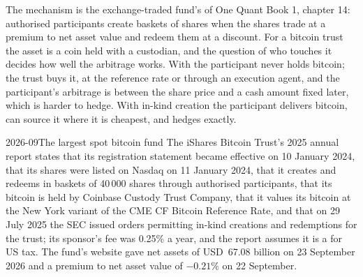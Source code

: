 The mechanism is the exchange-traded fund's of One Quant Book 1, chapter 14: authorised participants create baskets of shares when
the shares trade at a premium to net asset value and redeem them at a discount. For a bitcoin trust the asset is a coin held with a
custodian, and the question of who touches it decides how well the arbitrage works. With  the participant never holds
bitcoin; the trust buys it, at the reference rate or through an execution agent, and the participant's arbitrage is between the share
price and a cash amount fixed later, which is harder to hedge. With in-kind creation the participant delivers bitcoin, can source it
where it is cheapest, and hedges exactly.

\begin{dated}{2026-09}{The largest spot bitcoin fund}\label{dat:m3:dated-futures-options-and-etfs:ibit}
The iShares Bitcoin Trust's 2025 annual report states that its registration statement became effective on 10 January 2024, that its
shares were listed on Nasdaq on 11 January 2024, that it creates and redeems in baskets of 40\,000 shares through authorised
participants, that its bitcoin is held by Coinbase Custody Trust Company, that it values its bitcoin at the New York variant of the CME
CF Bitcoin Reference Rate, and that on 29 July 2025 the SEC issued orders permitting in-kind creations and redemptions for the trust;
its sponsor's fee was 0.25\% a year, and the report assumes it is a  for US tax. The fund's website gave net assets of
USD~67.08 billion on 23 September 2026 and a premium to net asset value of $-0.21\%$ on 22 September.
\end{dated}

